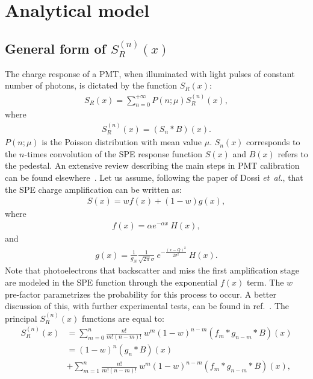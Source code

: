 \documentclass[preprint,12pt]{elsarticle}
\begin{document}
\section{Analytical model}
\label{sec:mod}
%

\subsection{General form of   $S^{(n)}_R(x)$ }
%

The charge response of a PMT, when illuminated with light pulses of constant number of photons, is dictated by the function $S_R(x)$:
\begin{align}
S_R(x) = \sum_{n=0}^{+\infty} P(n;\mu) S^{(n)}_R(x), \label{eq:SR}
\end{align}
where 
\begin{align}
S^{(n)}_R(x) = (S_n*B)(x). 
\end{align}
$ P(n;\mu)$ is the Poisson distribution with mean value $\mu$. 
$S_n(x)$ corresponds to the $n$-times convolution of the SPE response function $S(x)$ and $B(x)$ refers to the pedestal. 
An extensive review describing the main steps in PMT calibration can be found elsewhere~\cite{me}. 
Let us assume, following the paper of Dossi \emph{et~al.}, that the SPE charge amplification can be written as:
\begin{align}
S(x) = w f(x) + (1-w)g(x), \label{eq:S}
\end{align}
where 
\begin{align}
f(x) = \alpha e^{-\alpha x } \ H(x),
\end{align}
and
\begin{align}
g(x) = \frac{1}{g_N} \frac{1}{\sqrt{2\pi}\sigma} \ e^{ - \frac{( x - Q )^2}{2\sigma^2}} \ H(x). 
\end{align}
Note that photoelectrons that backscatter and miss the first amplification stage are modeled in the SPE function through the exponential $f(x)$ term. 
The $w$ pre-factor parametrizes the probability for this process to occur. A better discussion of this, with further experimental tests, can be found in ref.~\cite{dossi}. 
The principal $S^{(n)}_R(x)$ functions are equal to: %
\begin{align}
S^{(n)}_R(x) & = \sum_{m=0}^{n}  \frac{n!}{m!(n-m)!} \ w^m (1-w)^{n-m} (f_m*g_{n-m} *B )(x)\nonumber \\
                     & = (1-w)^n (g_{n} *B )(x) \nonumber \\
                    & + \sum_{m=1}^{n}  \frac{n!}{m!(n-m)!} \ w^m (1-w)^{n-m} (f_m*g_{n-m} *B )(x), \label{eq:snr1}
\end{align}
\end{document}
